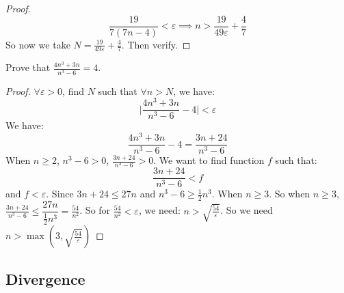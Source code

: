 \documentclass{report}
\begin{document}
\begin{examples}
\begin{example}
\begin{proof}
                \begin{equation*}
                    \dfrac{19}{7(7n - 4)} < \varepsilon \implies n > \dfrac{19}{49\varepsilon} + \dfrac{4}{7}
                \end{equation*}
            So now we take $N = \frac{19}{49\varepsilon} + \frac{4}{7}$. Then verify.
        \end{proof}
    \end{example}
    \begin{example}
        Prove that $\frac{4n^{3}  + 3n}{n^{3} - 6} = 4$. 
            \begin{proof}
                $\forall \varepsilon > 0$, find $N$ such that $\forall n> N$, we have:
                    \begin{equation*}
                        \lvert \dfrac{4n^{3} + 3n}{n^{3} - 6}  - 4 \rvert < \varepsilon
                    \end{equation*}
                We have:
                    \begin{equation*}
                        \dfrac{4n^{3} + 3n}{n^{3} - 6} - 4 = \dfrac{3n  + 24}{n^{3} - 6}
                    \end{equation*}
                When $n \geq 2$, $n^{3} - 6 > 0$, $\frac{3n + 24}{n^{3} - 6} > 0$. We want to find function $f$ such that:
                    \begin{equation*}
                        \dfrac{3n + 24}{n^{3} - 6} < f
                    \end{equation*}
                and $f < \varepsilon$. Since $3n + 24 \leq 27n$ and $n^{3} - 6 \geq \frac{1}{2}n^{3}$. When $n \geq 3$. So when $n \geq 3$, $\frac{3n + 24}{n^{3} - 6} \leq \dfrac{27n}{\frac{1}{2}n^{3}} = \frac{54}{n^{2}}$. So for $\frac{54}{n^{2}} <  \varepsilon$, we need: $n>  \sqrt{\frac{54}{\varepsilon}}$. So we need $n > \max(3, \sqrt{\frac{54}{\varepsilon}})$
            \end{proof}
    \end{example}
\end{examples}

\begin{topic}
    \section{Divergence}
\end{topic}
\end{document}

